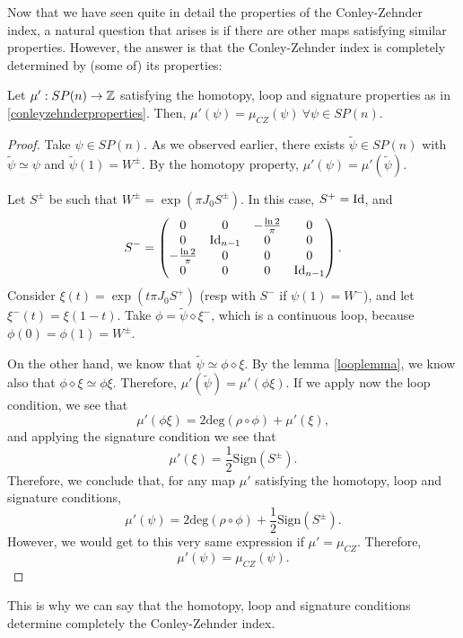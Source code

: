 Now that we have seen quite in detail the properties of the Conley-Zehnder index, a natural question that arises is if there are other maps satisfying similar properties. However, the answer is that the Conley-Zehnder index is completely determined by (some of) its properties:

\begin{theo} Let $\mu' : SP(n) \rightarrow \mathbb{Z}$ satisfying the homotopy, loop and signature properties as in \ref{conleyzehnderproperties}. Then, $\mu'(\psi) = \mu_{CZ}(\psi) \ \forall \psi \in SP(n)$.
\end{theo}

\begin{proof}
Take $\psi \in SP(n)$. As we observed earlier, there exists $\widetilde{\psi} \in SP(n)$ with $\widetilde{\psi} \simeq \psi$ and $\widetilde{\psi}(1) = W^{\pm}$. By the homotopy property, $\mu'(\psi) = \mu'(\widetilde{\psi})$.

Let $S^{\pm}$ be such that $W^{\pm} = \exp(\pi J_0S^{\pm})$. In this case, $S^+=\text{Id}$, and
\[S^- = \begin{pmatrix} 0 & 0 & -\frac{\ln 2}{\pi} & 0 \\ 0 & \text{Id}_{n-1} & 0 & 0 \\ -\frac{\ln 2}{\pi} & 0 & 0 & 0 \\ 0 & 0 & 0 & \text{Id}_{n-1} \end{pmatrix} .\]
Consider $\xi(t) = \exp(t\pi J_0S^+)$ (resp with $S^-$ if $\psi(1)=W^-$), and let $\xi^-(t) = \xi(1-t)$. Take $\phi = \widetilde{\psi} \diamond \xi^-$, which is a continuous loop, because $\phi(0) = \phi(1) = W^{\pm}$.

On the other hand, we know that $\widetilde{\psi} \simeq \phi \diamond \xi$. By the lemma \ref{looplemma}, we know also that $\phi \diamond \xi \simeq \phi\xi$. Therefore, $\mu'(\widetilde{\psi}) = \mu'(\phi\xi)$. If we apply now the loop condition, we see that
\[\mu'(\phi\xi) = 2\text{deg}(\rho \circ \phi) + \mu'(\xi) ,\]
and applying the signature condition we see that
\[\mu'(\xi) = \frac12 \text{Sign}(S^{\pm}) .\]
Therefore, we conclude that, for any map $\mu'$ satisfying the homotopy, loop and signature conditions,
\[\mu'(\psi) = 2\text{deg}(\rho \circ \phi) + \frac12 \text{Sign}(S^{\pm}).\]
However, we would get to this very same expression if $\mu'=\mu_{CZ}$. Therefore,
\[\mu'(\psi) = \mu_{CZ}(\psi) .\]
\end{proof}

This is why we can say that the homotopy, loop and signature conditions determine completely the Conley-Zehnder index.
